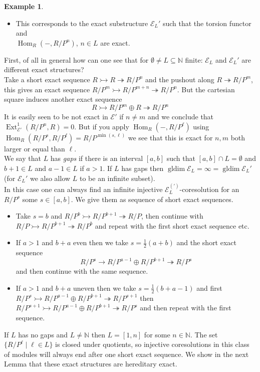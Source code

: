 \documentclass[11pt,a4paper]{amsart}
\theoremstyle{plain}
\theoremstyle{definition}
\newtheorem{exa}[thm]{Example}
\DeclareMathOperator{\Hom}{Hom}
\DeclareMathOperator{\Ext}{Ext}
\DeclareMathOperator{\gldim}{gldim}
\newcommand{\defl}{\twoheadrightarrow}
\newcommand{\infl}{\rightarrowtail}
\newcommand{\mcE}{\mathcal{E}}
\newcommand{\mcV}{\mathcal{V}}
\begin{document}
\begin{exa}
\begin{itemize}
    \item[($\mcV_L$)] This corresponds to the exact substructure $\mcE_L'$ such that the torsion functor and \\
    $\Hom_R(-,R/P^n)$, $n \in L$ are exact.  
\end{itemize}
First, of all in general how can one see that for $\emptyset\neq L \subseteq \mathbb{N}$ finite: $\mcE_L$ and $\mcE_L'$ are different exact structures?\\
Take a short exact sequence $R\infl R \defl R/P^n$ and the pushout along $R\defl R/P^m$, this gives an exact sequence $R/P^m \infl R/P^{m+n} \defl R/P^n$. But the cartesian square induces another exact sequence 
\[
R\infl R/P^m \oplus R \defl R/P^n
\]
It is easily seen to be not exact in $\mcE'$ if $n\neq m$ and we conclude that $\Ext^1_{\mcE'}(R/P^n,R)=0$. But if you apply 
$\Hom_R(-,R/P^{\ell})$ using $\Hom_R(R/P^s, R/P^{\ell})=R/P^{\min (s,\ell )}$ we see that this is exact for $n,m$ both larger or equal than $\ell$. \\
We say that $L$ has \emph{gaps} if there is an interval $[a,b]$ such that $[a,b]\cap L=\emptyset$ and $b+1\in L$ and $a-1\in L$ if $a>1$. 
If $L$ has gaps then $\gldim \mcE_L=\infty=\gldim\mcE_L'$ (for $\mcE_L'$ we also allow $L$ to be an infinite subset).\\
In this case one can always find an infinite injective $\mcE_L^{(')}$-coresolution for an $R/P^s$ some $s\in [a,b]$. We give them as sequence of short exact sequences.  
\begin{itemize}
\item[($a=1$)] Take $s=b$ and $R/P^b\infl R/P^{b+1} \defl R/P$, then continue with 
$R/P \infl R/P^{b+1} \defl R/P^b$ and repeat with the first short exact sequence etc. 
\item[(2)] If $a>1$ and $b+a$ even then we take $s=\frac{1}{2} (a+b)$ and the short exact sequence 
\[R/P^s\to R/P^{a-1}\oplus R/P^{b+1}\defl R/P^s\]
and then continue with the same sequence. 
\item[(3)] If $a>1$ and $b+a$ uneven then we take $s=\frac{1}{2}(b+a-1)$ and first $R/P^s\infl R/P^{a-1}\oplus R/P^{b+1} \defl R/P^{s+1} $ then 
$R/P^{s+1} \infl R/P^{a-1} \oplus R/P^{b+1} \defl R/P^s$ and then repeat with the first sequence. 
\end{itemize}



If $L$ has no gaps and $L \neq \mathbb{N}$ then $L=[1,n]$ for some $n\in \mathbb{N}$. The set $\{R/P^{\ell}\mid \ell\in L\}$ is closed under quotients, so injective coresolutions in this class of modules will always end after one short exact sequence. We show in the next Lemma that these exact structures are hereditary exact. 
\end{exa}
\end{document}
